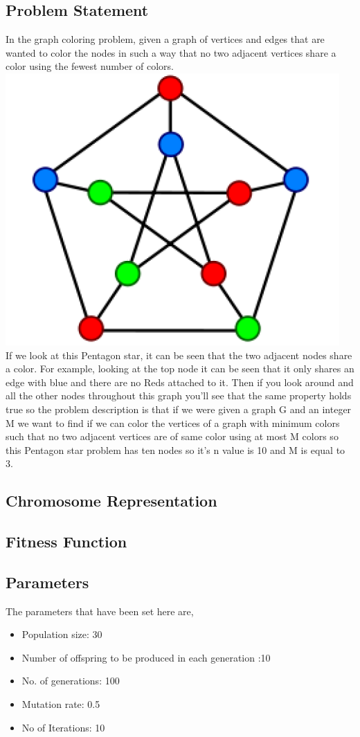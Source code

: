 \documentclass[11pt, letterpaper]{article}
\begin{document}
\subsection {Problem Statement}
In the graph coloring problem, given a graph of vertices and edges that are wanted to color the
nodes in such a way that no two adjacent vertices share a color using the fewest number of colors.
\includegraphics[scale=0.8]{images/graphCol.PNG}\\[1cm]
If we look at this Pentagon star, it can be seen that the two adjacent nodes share a color. For 
example, looking at the top node it can be seen that it only shares an edge with blue and there 
are no Reds attached to it. Then if you look around and all the other nodes throughout this graph 
you'll see that the same property holds true so the problem description is that if we were given a 
graph G and an integer M we want to find if we can color the vertices of a graph with minimum 
colors such that no two adjacent vertices are of same color using at most M colors so this Pentagon 
star problem has ten nodes so it's n value is 10 and M is equal to 3.\\
\subsection {Chromosome Representation}
\subsection {Fitness Function}
\subsection {Parameters}
The parameters that have been set here are,
\begin{itemize}
    \item Population size: 30
    \item Number of offspring to be produced in each generation :10
    \item No. of generations: 100
    \item Mutation rate: 0.5
    \item No of Iterations: 10
\end{itemize}
\end{document}
